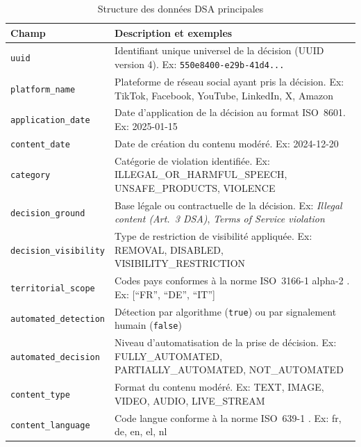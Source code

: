 \documentclass[10pt,twocolumn,a4paper]{article}
\begin{document}
\begin{table}[H]
\centering
\caption{Structure des données DSA principales}
\label{tab:data_structure}
\footnotesize
\begin{tabular}{|p{3cm}|p{5.2cm}|}
\hline
\textbf{Champ} & \textbf{Description et exemples} \\
\hline
\texttt{uuid} & Identifiant unique universel de la décision (UUID version 4). Ex: \texttt{550e8400-e29b-41d4...} \\
\hline
\texttt{platform\_name} & Plateforme de réseau social ayant pris la décision. Ex: TikTok, Facebook, YouTube, LinkedIn, X, Amazon \\
\hline
\texttt{application\_date} & Date d'application de la décision au format ISO~8601. Ex: 2025-01-15 \\
\hline
\texttt{content\_date} & Date de création du contenu modéré. Ex: 2024-12-20 \\
\hline
\texttt{category} & Catégorie de violation identifiée. Ex: ILLEGAL\_OR\_HARMFUL\_SPEECH, UNSAFE\_PRODUCTS, VIOLENCE \\
\hline
\texttt{decision\_ground} & Base légale ou contractuelle de la décision. Ex: \textit{Illegal content (Art.~3 DSA)}, \textit{Terms of Service violation} \\
\hline
\texttt{decision\_visibility} & Type de restriction de visibilité appliquée. Ex: REMOVAL, DISABLED, VISIBILITY\_RESTRICTION \\
\hline
\texttt{territorial\_scope} & Codes pays conformes à la norme ISO~3166-1 alpha-2 \cite{iso3166}. Ex: {[}``FR'', ``DE'', ``IT''{]} \\
\hline
\texttt{automated\_detection} & Détection par algorithme (\texttt{true}) ou par signalement humain (\texttt{false}) \\
\hline
\texttt{automated\_decision} & Niveau d'automatisation de la prise de décision. Ex: FULLY\_AUTOMATED, PARTIALLY\_AUTOMATED, NOT\_AUTOMATED \\
\hline
\texttt{content\_type} & Format du contenu modéré. Ex: TEXT, IMAGE, VIDEO, AUDIO, LIVE\_STREAM \\
\hline
\texttt{content\_language} & Code langue conforme à la norme ISO~639-1 \cite{iso639}. Ex: fr, de, en, el, nl \\
\hline
\end{tabular}
\end{table}
\end{document}
